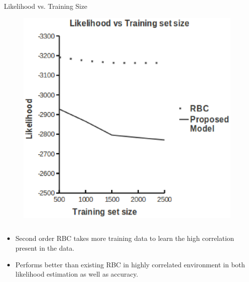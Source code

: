 \documentclass[10pt, blue,subsection=true, compress]{beamer}
\begin{document}
\begin{frame}
\begin{itemize}
\begin{columns}[t]
\begin{block}{Likelihood vs. Training Size}
\begin{figure}[htbp]
\centering
\includegraphics[scale=0.25]{img/lh-ts.eps}
\end{figure}

\end{block}
\end{columns}
\end{itemize}
\begin{itemize}
\item Second order RBC takes more training data to learn the high correlation present in the data.
\item Performs better than existing RBC in highly correlated environment
in both likelihood estimation as well as accuracy.
\end{itemize}
\end{frame}
\end{document}
